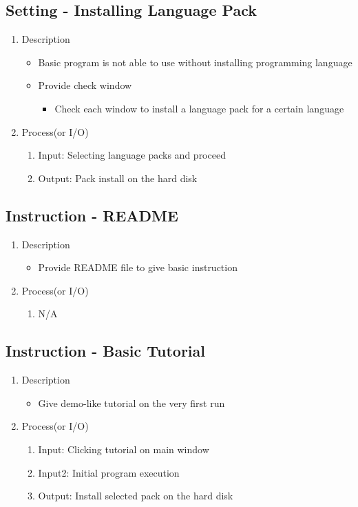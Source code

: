 \documentclass[conference]{IEEEtran}
\begin{document}
\subsection{Setting - Installing Language Pack}
\begin{enumerate}
  \item Description
  \begin{itemize}
    \item Basic program is not able to use without installing programming language
    \item Provide check window
    \begin{itemize}
      \item Check each window to install a language pack for a certain language 
    \end{itemize}
  \end{itemize}
  \item Process(or I/O)
  \begin{enumerate}
    \item Input: Selecting language packs and proceed 
    \item Output: Pack install on the hard disk
  \end{enumerate}
\end{enumerate}


\textit{}
\subsection{Instruction - README}
\begin{enumerate}
  \item Description
  \begin{itemize}
    \item Provide README file to give basic instruction
  \end{itemize}
  \item Process(or I/O)
  \begin{enumerate}
    \item N/A
  \end{enumerate}
\end{enumerate}


\textit{}

\subsection{Instruction - Basic Tutorial}
\begin{enumerate}
  \item Description
  \begin{itemize}
    \item Give demo-like tutorial on the very first run
  \end{itemize}
  \item Process(or I/O)
  \begin{enumerate}
    \item Input: Clicking tutorial on main window
    \item Input2: Initial program execution
    \item Output: Install selected pack on the hard disk
  \end{enumerate}
\end{enumerate}
\end{document}
